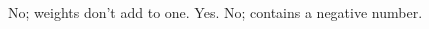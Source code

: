 \begin{EAnswer}{2.1}
\begin{ansparts*}
					\partsitem No; weights don't add to one.
					\partsitem Yes.
					\partsitem No; contains a negative number.
					\end{ansparts*}
\end{EAnswer}
